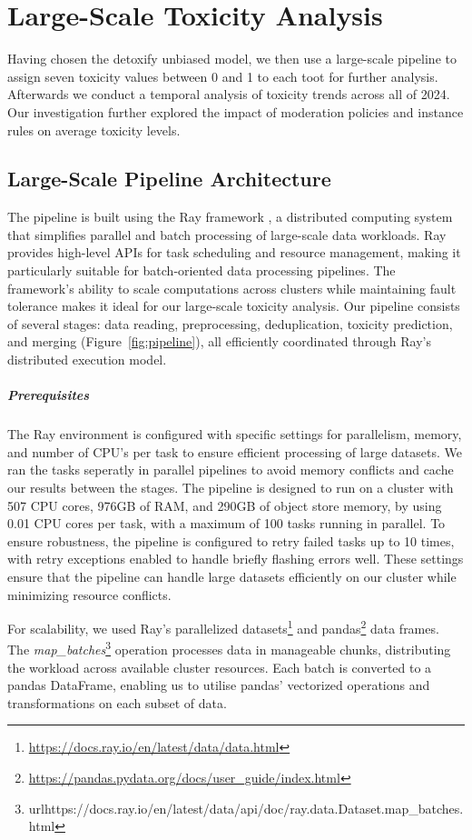 \chapter{Large-Scale Toxicity Analysis} \label{large-scale-analysis}
Having chosen the detoxify unbiased model, we then use a large-scale pipeline to assign seven toxicity values between 0 and 1 to each toot for further analysis. Afterwards we conduct a temporal analysis of toxicity trends across all of 2024. Our investigation further explored the impact of moderation policies and instance rules on average toxicity levels.

\section{Large-Scale Pipeline Architecture}
The pipeline is built using the Ray framework \cite{moritz:2018}, a distributed computing system that simplifies parallel and batch processing of large-scale data workloads. Ray provides high-level APIs for task scheduling and resource management, making it particularly suitable for batch-oriented data processing pipelines. The framework's ability to scale computations across clusters while maintaining fault tolerance makes it ideal for our large-scale toxicity analysis. Our pipeline consists of several stages: data reading, preprocessing, deduplication, toxicity prediction, and merging (Figure~\ref{fig:pipeline}), all efficiently coordinated through Ray's distributed execution model.

\paragraph{Prerequisites}
The Ray environment is configured with specific settings for parallelism, memory, and number of CPU's per task to ensure efficient processing of large datasets. We ran the tasks seperatly in parallel pipelines to avoid memory conflicts and cache our results between the stages. The pipeline is designed to run on a cluster with 507 CPU cores, 976GB of RAM, and 290GB of object store memory, by using 0.01 CPU cores per task, with a maximum of 100 tasks running in parallel. To ensure robustness, the pipeline is configured to retry failed tasks up to 10 times, with retry exceptions enabled to handle briefly flashing errors well. These settings ensure that the pipeline can handle large datasets efficiently on our cluster while minimizing resource conflicts.

For scalability, we used Ray's parallelized datasets\footnote{\url{https://docs.ray.io/en/latest/data/data.html}} and pandas\footnote{\url{https://pandas.pydata.org/docs/user\_guide/index.html}} data frames. The \textit{map\_batches}\footnote{url{https://docs.ray.io/en/latest/data/api/doc/ray.data.Dataset.map\_batches.html}} operation processes data in manageable chunks, distributing the workload across available cluster resources. Each batch is converted to a pandas DataFrame, enabling us to utilise pandas' vectorized operations and transformations on each subset of data.

